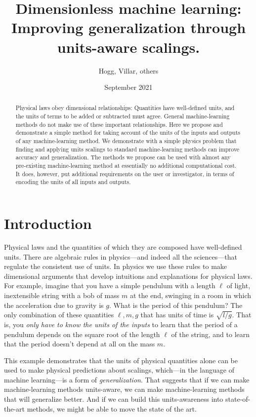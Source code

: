 \documentclass{article}
\title{\bfseries
Dimensionless machine learning:\\
Improving generalization through units-aware scalings.}
\author{Hogg, Villar, others}
\date{September 2021}
\begin{document}
\maketitle

\begin{abstract}\noindent
    Physical laws obey dimensional relationships:
    Quantities have well-defined units, and the units of terms to be added or subtracted must agree.
    General machine-learning methods do not make use of these important relationships.
    Here we propose and demonstrate a simple method for taking account of the units of the inputs and outputs of any machine-learning method.
    We demonstrate with a simple physics problem that finding and applying units scalings to standard machine-learning methods can improve accuracy and generalization.
    The methods we propose can be used with almost any pre-existing machine-learning method at essentially no additional computational cost.
    It does, however, put additional requirements on the user or investigator, in terms of encoding the units of all inputs and outputs.
\end{abstract}

\section{Introduction}

Physical laws and the quantities of which they are composed have well-defined units.
There are algebraic rules in physics---and indeed all the sciences---that regulate the consistent use of units.
In physics we use these rules to make dimensional arguments that develop intuitions and explanations for physical laws.
For example, imagine that you have a simple pendulum with a length $\ell$ of light, inextensible string with a bob of mass $m$ at the end, swinging in a room in which the acceleration due to gravity is $g$. What is the period of this pendulum? The only combination of these quantities $\ell, m, g$ that has units of time is $\sqrt{l/g}$. That is, you \emph{only have to know the units of the inputs} to learn that the period of a pendulum depends on the square root of the length $\ell$ of the string, and to learn that the period doesn't depend at all on the mass $m$.

This example demonstrates that the units of physical quantities alone can be used to make physical predictions about scalings, which---in the language of machine learning---is a form of \emph{generalization}.
That suggests that if we can make machine-learning methods units-aware, we can make machine-learning methods that will generalize better.
And if we can build this units-awareness into state-of-the-art methods, we might be able to move the state of the art.
\end{document}

